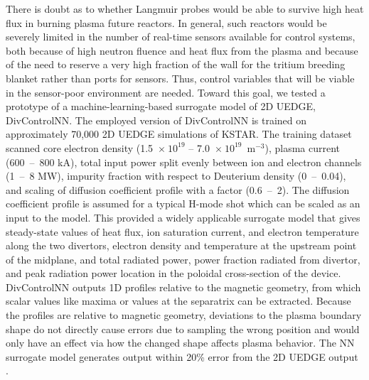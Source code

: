 \documentclass[10pt]{iopart}
\begin{document}
There is doubt as to whether Langmuir probes would be able to survive high heat flux in burning plasma future reactors.
In general, such reactors would be severely limited in the number of real-time sensors available for control systems, both because of high neutron fluence and heat flux from the plasma and because of the need to reserve a very high fraction of the wall for the tritium breeding blanket rather than ports for sensors.
Thus, control variables that will be viable in the sensor-poor environment are needed.
Toward this goal, we tested a prototype of a machine-learning-based surrogate model of 2D UEDGE, DivControlNN.
The employed version of DivControlNN is trained on approximately 70,000 2D UEDGE simulations of KSTAR.
The training dataset scanned core electron density (1.5~$\times~10^{19}$ -- 7.0~$\times~10^{19}$~m$^{-3}$), plasma current (600~--~800 kA), total input power split evenly between ion and electron channels (1~--~8 MW), impurity fraction with respect to Deuterium density (0~--~0.04), and scaling of diffusion coefficient profile with a factor (0.6~--~2).
The diffusion coefficient profile is assumed for a typical H-mode shot which can be scaled as an input to the model.
This provided a widely applicable surrogate model that gives steady-state values of heat flux, ion saturation current, and electron temperature along the two divertors, electron density and temperature at the upstream point of the midplane, and total radiated power, power fraction radiated from divertor, and peak radiation power location in the poloidal cross-section of the device.
DivControlNN outputs 1D profiles relative to the magnetic geometry, from which scalar values like maxima or values at the separatrix can be extracted.
Because the profiles are relative to magnetic geometry, deviations to the plasma boundary shape do not directly cause errors due to sampling the wrong position and would only have an effect via how the changed shape affects plasma behavior.
The NN surrogate model generates output within 20\% error from the 2D UEDGE output \cite{zhu_2025_pop}.
\end{document}
